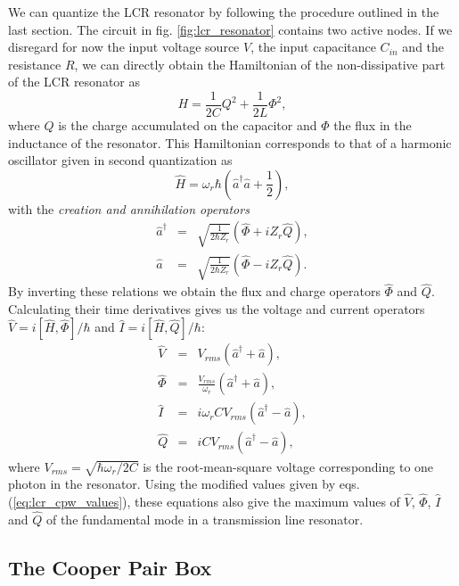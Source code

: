 We can quantize the LCR resonator by following the procedure outlined in the last section. The circuit in fig. \ref{fig:lcr_resonator} contains two active nodes. If we disregard for now the input voltage source $V$, the input capacitance $C_{in}$ and the resistance $R$, we can directly obtain the Hamiltonian of the non-dissipative part of the LCR resonator as
%
\begin{equation}
H = \frac{1}{2C}Q^2+\frac{1}{2L}\Phi^2,
\end{equation}
%
where $Q$ is the charge accumulated on the capacitor and $\Phi$ the flux in the inductance of the resonator. This Hamiltonian corresponds to that of a harmonic oscillator given in second quantization as
%
\begin{equation}
\hat{H} = \omega_r\hbar\left(\hat{a}^\dagger\hat{a}+\frac{1}{2}\right), \label{eq:lc_hamiltonian}
\end{equation}
%
with the {\it creation and annihilation operators}
%
\begin{eqnarray}
\hat{a}^\dagger & = & \sqrt{\frac{1}{2\hbar Z_r}}\left(\hat{\Phi}+iZ_r \hat{Q}\right),\\
\hat{a} & = & \sqrt{\frac{1}{2\hbar Z_r}}\left( \hat{\Phi}-iZ_r \hat{Q}\right).
\end{eqnarray}
%
By inverting these relations we obtain the flux and charge operators $\hat{\Phi}$ and $\hat{Q}$. Calculating their time derivatives gives us the voltage and current operators $\hat{V}=i[\hat{H},\hat{\Phi}]/\hbar$ and $\hat{I}=i[\hat{H},\hat{Q}]/\hbar$:
%
\begin{eqnarray}
\hat{V} & = & V_{rms}\left(\hat{a}^\dagger+\hat{a}\right), \\
\hat{\Phi} & = & \frac{V_{rms}}{\omega_r}\left(\hat{a}^\dagger+\hat{a}\right), \\
\hat{I} & = & i \omega_r C V_{rms}\left(\hat{a}^\dagger-\hat{a}\right), \\
\hat{Q} & = & i C V_{rms}\left(\hat{a}^\dagger-\hat{a}\right),
\end{eqnarray}
%
where $V_{rms} = \sqrt{\hbar\omega_r/2C}$ is the root-mean-square voltage corresponding to one photon in the resonator. Using the modified values given by eqs. (\ref{eq:lcr_cpw_values}), these equations also give the maximum values of $\hat{V}$, $\hat{\Phi}$, $\hat{I}$ and $\hat{Q}$ of the fundamental mode in a transmission line resonator.

\subsection{The Cooper Pair Box}

